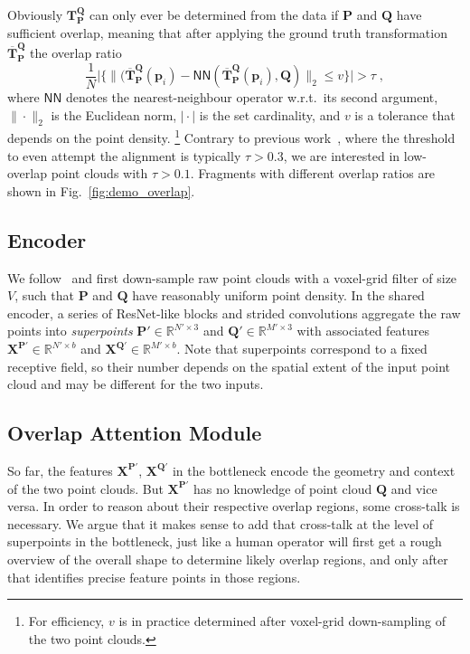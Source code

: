 Obviously $\mathbf{T}_\mathbf{P}^\mathbf{Q}$ can only ever be determined from the data if $\mathbf{P}$ and $\mathbf{Q}$ have sufficient overlap, meaning that after applying the ground truth transformation $\overbar{\mathbf{T}}_\mathbf{P}^\mathbf{Q}$ the overlap ratio
\begin{equation}
 \frac{1}{N}\big|\big\{\|(\overbar{\mathbf{T}}_\mathbf{P}^ \mathbf{Q}(\mathbf{p}_i)-\mathsf{NN}(\overbar{\mathbf{T}}_\mathbf{P}^\mathbf{Q}(\mathbf{p}_i),\mathbf{Q})\|_2%
 \leq v\big\}\big|>\tau\;,
    \label{eq:overlap_ratio}
\end{equation}
where $\mathsf{NN}$ denotes the nearest-neighbour operator w.r.t.\ its second argument, $\|\!\cdot\!\|_2$ is the Euclidean norm, $|\!\cdot\!|$ is the set cardinality, and $v$ is a tolerance that depends on the point density.%
\footnote{For efficiency, $v$ is in practice determined after voxel-grid down-sampling of the two point clouds.} %
Contrary to previous work~\cite{zeng20163dmatch,khoury2017CGF}, where the threshold to even attempt the alignment is typically $\tau\!>\!0.3$, we are interested in low-overlap point clouds with $\tau\!>\!0.1$. Fragments with different overlap ratios are shown in Fig.~\ref{fig:demo_overlap}.


\subsection{Encoder}
\label{sec:method_encoder}
We follow~\cite{thomas2019kpconv} and first down-sample raw point clouds with a voxel-grid filter of size $V$, such that
$\mathbf{P}$ and $\mathbf{Q}$ have reasonably uniform point density.
In the shared encoder, a series of ResNet-like blocks and strided convolutions aggregate the raw points into \textit{superpoints} $\mathbf{P}'\in\mathbb{R}^{N'\times 3}$ and 
$\mathbf{Q}'\in\mathbb{R}^{M'\times 3}$ with associated features $\mathbf{X}^{\mathbf{P}'} \in \mathbb{R}^{N{'} \times b}$ and $\mathbf{X}^{\mathbf{Q}'} \in \mathbb{R}^{M' \times b}$.
Note that superpoints correspond to a fixed receptive field, so their number depends on the spatial extent of the input point cloud and may be different for the two inputs.

\subsection{Overlap Attention Module}
\label{sec:method_overlap_attention}
So far, the features $\mathbf{X}^{\mathbf{P}'}$, $\mathbf{X}^{\mathbf{Q}'}$ in the bottleneck encode the geometry and context of the two point clouds. But $\mathbf{X}^{\mathbf{P}'}$ has no knowledge of point cloud $\mathbf{Q}$ and vice versa.
In order to reason about their respective overlap regions, some cross-talk is necessary.
We argue that it makes sense to add that cross-talk at the level of superpoints in the bottleneck, just like a human operator will first get a rough overview of the overall shape to determine likely overlap regions, and only after that identifies precise feature points in those regions.

